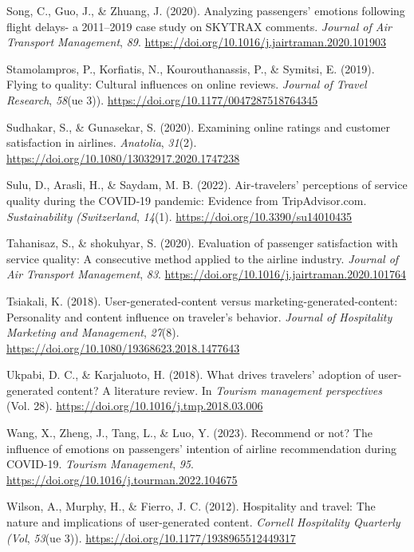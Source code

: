 \documentclass[
]{agujournal2019}
\newlength{\cslhangindent}
\newenvironment{CSLReferences}[2] %
 {\begin{list}{}{%
  \setlength{\itemindent}{0pt}
  \setlength{\leftmargin}{0pt}
  \setlength{\parsep}{0pt}
  \ifodd #1
   \setlength{\leftmargin}{\cslhangindent}
   \setlength{\itemindent}{-1\cslhangindent}
  \fi
  \setlength{\itemsep}{#2\baselineskip}}}
 {\end{list}}
\begin{document}
\begin{CSLReferences}{1}{0}
Song, C., Guo, J., \& Zhuang, J. (2020). Analyzing passengers' emotions
following flight delays- a 2011--2019 case study on SKYTRAX comments.
\emph{Journal of Air Transport Management}, \emph{89}.
\url{https://doi.org/10.1016/j.jairtraman.2020.101903}

Stamolampros, P., Korfiatis, N., Kourouthanassis, P., \& Symitsi, E.
(2019). Flying to quality: Cultural influences on online reviews.
\emph{Journal of Travel Research}, \emph{58}(ue 3)).
\url{https://doi.org/10.1177/0047287518764345}

Sudhakar, S., \& Gunasekar, S. (2020). Examining online ratings and
customer satisfaction in airlines. \emph{Anatolia}, \emph{31}(2).
\url{https://doi.org/10.1080/13032917.2020.1747238}

Sulu, D., Arasli, H., \& Saydam, M. B. (2022). Air‐travelers'
perceptions of service quality during the COVID‐19 pandemic: Evidence
from TripAdvisor.com. \emph{Sustainability (Switzerland}, \emph{14}(1).
\url{https://doi.org/10.3390/su14010435}

Tahanisaz, S., \& shokuhyar, S. (2020). Evaluation of passenger
satisfaction with service quality: A consecutive method applied to the
airline industry. \emph{Journal of Air Transport Management}, \emph{83}.
\url{https://doi.org/10.1016/j.jairtraman.2020.101764}

Tsiakali, K. (2018). User-generated-content versus
marketing-generated-content: Personality and content influence on
traveler's behavior. \emph{Journal of Hospitality Marketing and
Management}, \emph{27}(8).
\url{https://doi.org/10.1080/19368623.2018.1477643}

Ukpabi, D. C., \& Karjaluoto, H. (2018). What drives travelers' adoption
of user-generated content? A literature review. In \emph{Tourism
management perspectives} (Vol. 28).
\url{https://doi.org/10.1016/j.tmp.2018.03.006}

Wang, X., Zheng, J., Tang, L., \& Luo, Y. (2023). Recommend or not? The
influence of emotions on passengers' intention of airline recommendation
during COVID-19. \emph{Tourism Management}, \emph{95}.
\url{https://doi.org/10.1016/j.tourman.2022.104675}

Wilson, A., Murphy, H., \& Fierro, J. C. (2012). Hospitality and travel:
The nature and implications of user-generated content. \emph{Cornell
Hospitality Quarterly (Vol}, \emph{53}(ue 3)).
\url{https://doi.org/10.1177/1938965512449317}


\end{CSLReferences}
\end{document}
